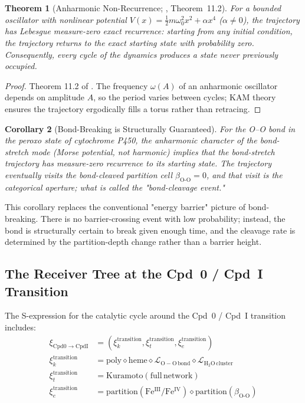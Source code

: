 \documentclass[11pt,twocolumn,a4paper]{article}
\newtheorem{theorem}{Theorem}[section]
\newtheorem{corollary}[theorem]{Corollary}
\theoremstyle{definition}
\theoremstyle{remark}
\newcommand{\Sexp}{\xi}
\newcommand{\Leaf}{\mathcal{L}}
\newcommand{\bondorder}{\beta_{\mathrm{O\text{-}O}}}
\begin{document}
\begin{theorem}[Anharmonic Non-Recurrence; \citealt{sachikonye2025_isomorphism}, Theorem~11.2]
\label{thm:anharmonic_recurrence}
For a bounded oscillator with nonlinear potential
$V(x) = \tfrac{1}{2}m\omega_0^2 x^2 + \alpha x^4$ ($\alpha \neq 0$), the
trajectory has Lebesgue measure-zero exact recurrence: starting from any
initial condition, the trajectory returns to the exact starting state with
probability zero. Consequently, every cycle of the dynamics produces a state
never previously occupied.
\end{theorem}

\begin{proof}
Theorem 11.2 of \citep{sachikonye2025_isomorphism}. The frequency $\omega(A)$
of an anharmonic oscillator depends on amplitude $A$, so the period varies
between cycles; KAM theory ensures the trajectory ergodically fills a
torus rather than retracing.
\end{proof}

\begin{corollary}[Bond-Breaking is Structurally Guaranteed]
\label{cor:bond_break_guaranteed}
For the O--O bond in the peroxo state of cytochrome P450, the anharmonic
character of the bond-stretch mode (Morse potential, not harmonic) implies
that the bond-stretch trajectory has measure-zero recurrence to its
starting state. The trajectory eventually visits the bond-cleaved partition
cell $\bondorder = 0$, and that visit is the categorical aperture; what is
called the "bond-cleavage event."
\end{corollary}

This corollary replaces the conventional "energy barrier" picture of
bond-breaking. There is no barrier-crossing event with low probability;
instead, the bond is structurally certain to break given enough time, and
the cleavage rate is determined by the partition-depth change rather than
a barrier height.

\subsection{The Receiver Tree at the Cpd~0 / Cpd~I Transition}

The S-expression for the catalytic cycle around the Cpd~0 / Cpd~I transition
includes:
\begin{align}
\Sexp_{\mathrm{Cpd0\to CpdI}} &= (\Sexp_k^{\mathrm{transition}}, \Sexp_t^{\mathrm{transition}}, \Sexp_e^{\mathrm{transition}}) \\
\Sexp_k^{\mathrm{transition}} &= \mathrm{poly} \diamond \mathrm{heme} \diamond \Leaf_{\mathrm{O-O\,bond}} \diamond \Leaf_{\mathrm{H_2O\,cluster}} \\
\Sexp_t^{\mathrm{transition}} &= \mathrm{Kuramoto}(\mathrm{full\,network}) \\
\Sexp_e^{\mathrm{transition}} &= \mathrm{partition}(\mathrm{Fe^{III}/Fe^{IV}}) \diamond \mathrm{partition}(\bondorder)
\end{align}
\end{document}
